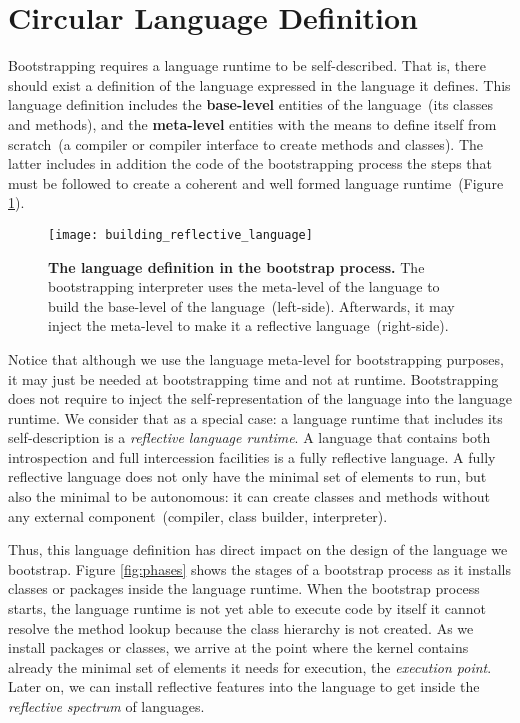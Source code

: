 \section{Circular Language Definition}\label{sec:circular_definition}

Bootstrapping requires a language runtime to be self-described. That is, there should exist a definition of the language expressed in the language it defines. This language definition includes the \textbf{base-level} entities of the language~(its classes and methods), and the \textbf{meta-level} entities with the means to define itself from scratch~(\eg a compiler or compiler interface to create methods and classes). The latter includes in addition the code of the bootstrapping process \ie the steps that must be followed to create a coherent and well formed language runtime~(Figure \ref{fig:language_definition}).

\begin{figure}[ht]
\center
\texttt{[image: building\_reflective\_language]}
\caption{\textbf{The language definition in the bootstrap process.} The bootstrapping interpreter uses the meta-level of the language to build the base-level of the language~(left-side). Afterwards, it may inject the meta-level to make it a reflective language~(right-side).\label{fig:language_definition}}
\end{figure}

Notice that although we use the language meta-level for bootstrapping purposes, it may just be needed at bootstrapping time and not at runtime. Bootstrapping does not require to inject the self-representation of the language into the language runtime. We consider that as a special case: a language runtime that includes its self-description is a \emph{reflective language runtime}.
A language that contains both introspection and full intercession facilities is a fully reflective language. A fully reflective language does not only have the minimal set of elements to run, but also the minimal to be autonomous: it can create classes and methods without any external component~(compiler, class builder, interpreter).

Thus, this language definition has direct impact on the design of the language we bootstrap. Figure \ref{fig:phases} shows the stages of a bootstrap process as it installs classes or packages inside the language runtime. When the bootstrap process starts, the language runtime is not yet able to execute code by itself \eg it cannot resolve the method lookup because the class hierarchy is not created. As we install packages or classes, we arrive at the point where the kernel contains already the minimal set of elements it needs for execution, the \emph{execution point}. Later on, we can install reflective features into the language to get inside the \emph{reflective spectrum} of languages. 

